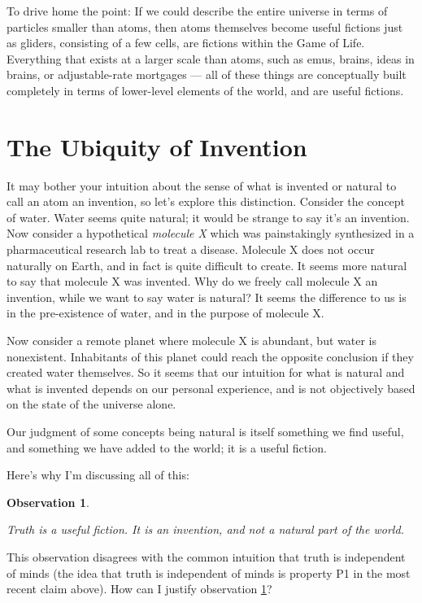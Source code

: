 \documentclass[9pt, twoside]{book}
\newtheorem{obs}{Observation}
\theoremstyle{argtstyle}
\begin{document}
To drive home the point: If we could describe the entire universe in terms
of particles smaller than atoms, then atoms themselves become useful fictions
just as gliders, consisting of a few cells, are fictions within the Game of Life.
Everything that exists at a larger scale than atoms, such as emus, brains, ideas in
brains, or adjustable-rate mortgages --- all of these things are conceptually
built completely in terms of lower-level elements of the world, and are useful
fictions.

\section{The Ubiquity of Invention}

It may bother your intuition about the sense of what is invented or natural
to call an atom an invention, so let's explore this distinction.
Consider the concept of water.
Water seems quite natural;
it would be strange to say it's an invention.
Now consider a hypothetical {\em molecule X} which was painstakingly synthesized
in a pharmaceutical research lab to treat a disease.
Molecule X does not occur naturally on Earth,
and in fact is quite difficult to create. It seems more natural to say that
molecule X was invented.
Why do we freely call molecule X an invention, while we want to say
water is natural?
It seems the difference to us is in the pre-existence of water, and
in the purpose of molecule X.

Now consider a remote planet where molecule X is abundant, but water is
nonexistent. Inhabitants of this planet could reach the opposite conclusion if
they created water themselves. So it seems that our intuition for what is
natural and what is invented depends on our personal experience, and is
not objectively based on the state of the universe alone.

Our judgment of some concepts being natural is itself something
we find useful, and something we have added to the world; it is a useful
fiction.

Here's why I'm discussing all of this:
\newcommand{\obsthree}{
    Truth is a useful fiction. It is an invention, and not a natural part of the
    world.
}
\begin{obs}\label{o3}
    \obsthree
\end{obs}

This observation disagrees with the common intuition that truth is
independent of minds (the idea that truth is independent of minds is
property P1 in the most recent claim above).
How can I justify observation \ref{o3}?
\end{document}
